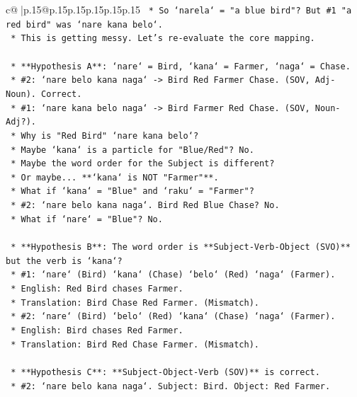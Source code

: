 \documentclass{article}
\begin{document}
{\begin{supertabular}{c@{$\;$}|p{.15\linewidth}@{}p{.15\linewidth}p{.15\linewidth}p{.15\linewidth}p{.15\linewidth}p{.15\linewidth}}
{{{\texttt{        *   So `narela` = "a blue bird"? But \#1 "a red bird" was `nare kana belo`.} \\
\texttt{        *   This is getting messy. Let's re{-}evaluate the core mapping.} \\
\\ 
\texttt{    *   **Hypothesis A**: `nare` = Bird, `kana` = Farmer, `naga` = Chase.} \\
\texttt{        *   \#2: `nare belo kana naga` {-}> Bird Red Farmer Chase. (SOV, Adj{-}Noun). Correct.} \\
\texttt{        *   \#1: `nare kana belo naga` {-}> Bird Farmer Red Chase. (SOV, Noun{-}Adj?).} \\
\texttt{            *   Why is "Red Bird" `nare kana belo`?} \\
\texttt{            *   Maybe `kana` is a particle for "Blue/Red"? No.} \\
\texttt{            *   Maybe the word order for the Subject is different?} \\
\texttt{            *   Or maybe... **`kana` is NOT "Farmer"**.} \\
\texttt{            *   What if `kana` = "Blue" and `raku` = "Farmer"?} \\
\texttt{                *   \#2: `nare belo kana naga`. Bird Red Blue Chase? No.} \\
\texttt{            *   What if `nare` = "Blue"? No.} \\
\\ 
\texttt{    *   **Hypothesis B**: The word order is **Subject{-}Verb{-}Object (SVO)** but the verb is `kana`?} \\
\texttt{        *   \#1: `nare` (Bird) `kana` (Chase) `belo` (Red) `naga` (Farmer).} \\
\texttt{            *   English: Red Bird chases Farmer.} \\
\texttt{            *   Translation: Bird Chase Red Farmer. (Mismatch).} \\
\texttt{        *   \#2: `nare` (Bird) `belo` (Red) `kana` (Chase) `naga` (Farmer).} \\
\texttt{            *   English: Bird chases Red Farmer.} \\
\texttt{            *   Translation: Bird Red Chase Farmer. (Mismatch).} \\
\\ 
\texttt{    *   **Hypothesis C**: **Subject{-}Object{-}Verb (SOV)** is correct.} \\
\texttt{        *   \#2: `nare belo kana naga`. Subject: Bird. Object: Red Farmer.} \\
}}}
\end{supertabular}}
\end{document}
